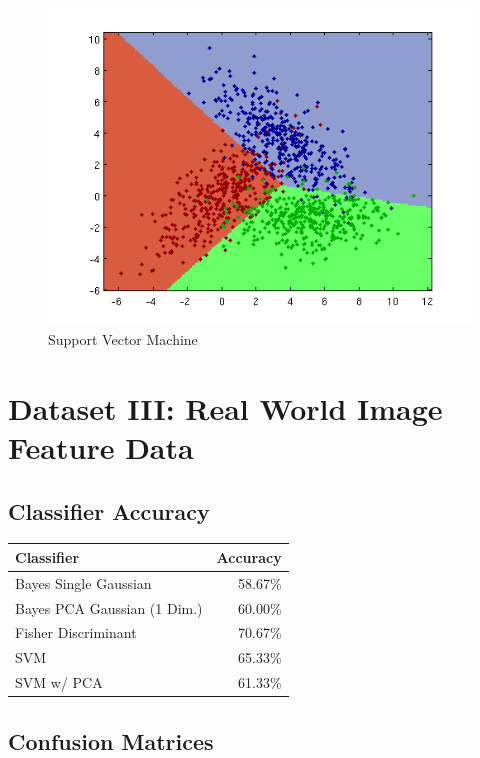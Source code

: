 \documentclass[a4paper]{article}
\begin{document}
\begin{figure}[htbp!]
\center
\includegraphics[clip, trim=40px 15px 30px 10px]{svm_d.png}
\caption{Support Vector Machine}
\end{figure}


\newpage


\section{Dataset III: Real World Image Feature Data}

\subsection{Classifier Accuracy}

\begin{tabular}{ | l | r | }
\hline
\textbf{Classifier} & \textbf{Accuracy} \\
\hline
Bayes Single Gaussian  &   58.67\% \\
\hline
Bayes PCA Gaussian (1 Dim.)  &   60.00\% \\
\hline
Fisher Discriminant  &   70.67\% \\
\hline
SVM          &   65.33\% \\
\hline
SVM w/ PCA & 61.33\% \\
\hline
\end{tabular}


\subsection{Confusion Matrices}
\end{document}
